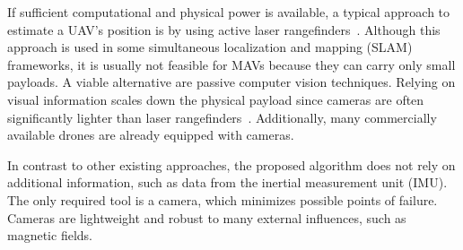 If sufficient computational and physical power is available, a typical
approach to estimate a UAV's position is by using active laser
rangefinders~\cite{grzonka2009towards,bachrach2009autonomous}.
Although this approach is used in some simultaneous localization and
mapping (SLAM) frameworks, it is usually not feasible for MAVs because
they can carry only small payloads. A viable alternative are passive
computer vision techniques. Relying on visual information scales down
the physical payload since cameras are often significantly lighter
than laser
rangefinders~\cite{blosch2010vision,angeli20062d,ahrens2009vision}.
Additionally, many commercially available drones are already equipped
with cameras.

In contrast to other existing approaches, the proposed algorithm does not rely on additional information, such as data from the inertial measurement unit (IMU). The only required tool is a camera, which minimizes possible points of failure. Cameras are lightweight and robust to many external influences, such as magnetic fields. 